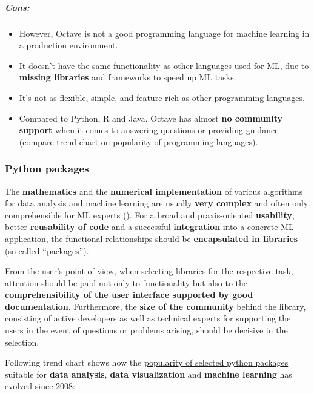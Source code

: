 \documentclass [oneside,10pt,a4paper,ngerman,BCOR10mm,headsepline,parindent,final]{scrartcl}
\providecommand{\tightlist}{%
      \setlength{\itemsep}{0pt}\setlength{\parskip}{0pt}}
\begin{document}
\hypertarget{cons}{%
\subparagraph{Cons:}\label{cons}}

\begin{itemize}
\tightlist
\item
  However, Octave is not a good programming language for machine
  learning in a production environment.
\item
  It doesn't have the same functionality as other languages used for ML,
  due to \textbf{missing libraries} and frameworks to speed up ML tasks.
\item
  It's not as flexible, simple, and feature-rich as other programming
  languages.
\item
  Compared to Python, R and Java, Octave has almost \textbf{no community
  support} when it comes to answering questions or providing guidance
  (compare trend chart on popularity of programming languages).
\end{itemize}

    \hypertarget{python-packages}{%
\subsubsection{Python packages}\label{python-packages}}

The \textbf{mathematics} and the \textbf{numerical implementation} of
various algorithms for data analysis and machine learning are usually
\textbf{very complex} and often only comprehensible for ML experts
(\cite{ML_bestLanguage_2021}). For a broad and praxis-oriented
\textbf{usability}, better \textbf{reusability of code} and a successful
\textbf{integration} into a concrete ML application, the functional
relationships should be \textbf{encapsulated in libraries} (so-called
``packages'').

From the user's point of view, when selecting libraries for the
respective task, attention should be paid not only to functionality but
also to the \textbf{comprehensibility of the user interface supported by
good documentation}. Furthermore, the \textbf{size of the community}
behind the library, consisting of active developers as well as technical
experts for supporting the users in the event of questions or problems
arising, should be decisive in the selection.

Following trend chart shows how the
\href{https://insights.stackoverflow.com/trends?tags=pandas\%2Cnumpy\%2Cmatplotlib\%2Cseaborn\%2Cscikit-learn\%2Ctensorflow\%2Ckeras\%2Cpytorch}{popularity
of selected python packages} suitable for \textbf{data analysis},
\textbf{data visualization} and \textbf{machine learning} has evolved
since 2008:
\end{document}
